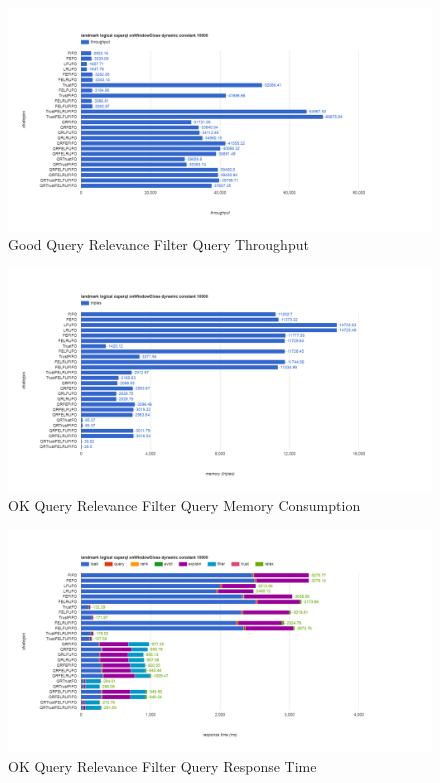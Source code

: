 \begin{figure}[!htbp]
	\centering
    \includegraphics[width=6.5in]{img/app3-gqr-t.png}
    \caption{Good Query Relevance Filter Query Throughput}
\end{figure}
\begin{figure}[!htbp]
	\centering
    \includegraphics[width=6.5in]{img/app3-oqr-m.png}
    \caption{OK Query Relevance Filter Query Memory Consumption}
\end{figure}
\begin{figure}[!htbp]
	\centering
    \includegraphics[width=6.5in]{img/app3-oqr-r.png}
    \caption{OK Query Relevance Filter Query Response Time}
\end{figure}
